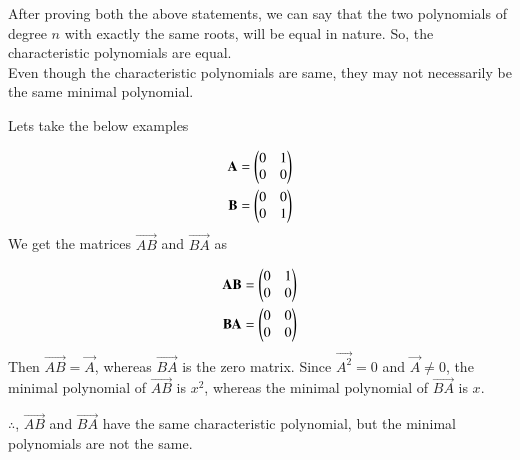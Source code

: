 	After proving both the above statements, we can say that the two polynomials of degree $n$ with exactly the same roots, will be equal in nature. So, the characteristic polynomials are equal. \\
	
	Even though the characteristic polynomials are same, they may not necessarily be the same minimal polynomial.
	
	Lets take the below examples
	
	\begin{align}
		\mathbf{A} = \begin{pmatrix}0&1\\0&0\end{pmatrix} \\
		\mathbf{B} = \begin{pmatrix}0&0\\0&1\end{pmatrix}
	\end{align}
	We get the matrices $\vec{AB}$ and $\vec{BA}$ as
	
	\begin{align}
		\mathbf{AB} = \begin{pmatrix}0&1\\0&0\end{pmatrix} \\
		\mathbf{BA} = \begin{pmatrix}0&0\\0&0\end{pmatrix}
	\end{align}
	Then $\vec{AB} = \vec{A}$, whereas $\vec{BA}$ is the zero matrix. Since $\vec{A^2} = 0$ and $\vec{A} \neq 0$, the minimal polynomial of $\vec{AB}$ is $x^2$, whereas the minimal polynomial of $\vec{BA}$ is $x$.
	
	$\therefore$, $\vec{AB}$ and $\vec{BA}$ have the same characteristic polynomial, but the minimal polynomials are not the same.
	
	
